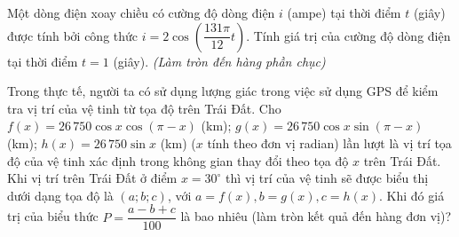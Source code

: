 \begin{bt}%

	Một dòng điện xoay chiều có cường độ dòng điện $i$ (ampe) tại thời điểm $t$ (giây) được tính bởi công thức $i=2\cos\left(\dfrac{131\pi}{12}t\right)$. Tính giá trị của cường độ dòng điện tại thời điểm  $t=1$ (giây). \textit{(Làm tròn đến hàng phần chục)} 
	
\end{bt}

\begin{bt}%
	Trong thực tế, người ta có sử dụng lượng giác trong việc sử dụng GPS để kiểm tra vị trí của vệ tinh từ tọa độ trên Trái Đất. Cho $ f(x) = 26\,750 \cos x\cos(\pi-x)$ (km); $g(x)=26\,750\cos x\sin(\pi-x)$ (km); $h(x)=26\,750\sin x$ (km) ($x$ tính theo đơn vị radian) lần lượt là vị trí tọa độ của vệ tinh xác định trong không gian thay đổi theo tọa độ $x$ trên Trái Đất. Khi vị trí trên Trái Đất ở điểm $x=30^\circ$ thì vị trí của vệ tinh sẽ được biểu thị dưới dạng tọa độ là $(a;b;c)$, với $a=f(x),b=g(x),c=h(x)$. Khi đó giá trị của biểu thức $P=\dfrac{a-b+c}{100}$ là bao nhiêu (làm tròn kết quả đến hàng đơn vị)?
\end{bt}

